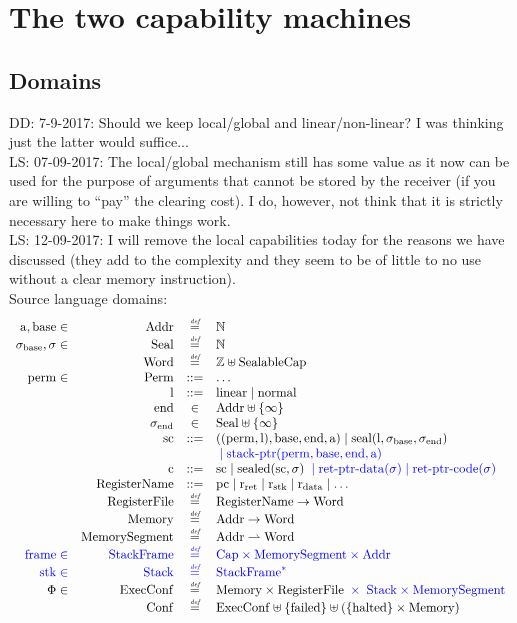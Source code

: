 \documentclass[a4paper]{article}
\newcommand\lau[1]{{\color{purple} \sf \footnotesize {LS: #1}}\\}
\newcommand\dominique[1]{{\color{purple} \sf \footnotesize {DD: #1}}\\}
\newcommand{\defeq}{\stackrel{\textit{\tiny{def}}}{=}}
\newcommand{\defbnf}{::=}
\newcommand{\fun}{\rightarrow}
\newcommand{\parfun}{\rightharpoonup}
\newcommand{\sourcecolor}{\color{blue}}
\newcommand{\src}[1]{{\sourcecolor #1}}
\newcommand{\nats}{\mathbb{N}}
\newcommand{\ints}{\mathbb{Z}}
\newcommand{\shareddom}[1]{\mathrm{#1}}
\newcommand{\RegName}{\shareddom{RegisterName}}
\newcommand{\Addr}{\shareddom{Addr}}
\newcommand{\Seal}{\shareddom{Seal}}
\newcommand{\Perm}{\shareddom{Perm}}
\newcommand{\Caps}{\shareddom{Cap}}
\newcommand{\SealableCaps}{\shareddom{SealableCap}}
\newcommand{\Word}{\shareddom{Word}}
\newcommand{\Mem}{\shareddom{Memory}}
\newcommand{\Reg}{\shareddom{RegisterFile}}
\newcommand{\Conf}{\shareddom{Conf}}
\newcommand{\ExecConf}{\shareddom{ExecConf}}
\newcommand{\MemSeg}{\shareddom{MemorySegment}}
\newcommand{\StkFrame}{\shareddom{StackFrame}}
\newcommand{\Stack}{\shareddom{Stack}}
\newcommand{\scbnf}{\shareddom{sc}}
\newcommand{\cbnf}{\shareddom{c}}
\newcommand{\permbnf}{\shareddom{perm}}
\newcommand{\addrbnf}{\shareddom{a}}
\newcommand{\basebnf}{\shareddom{base}}
\newcommand{\aendbnf}{\shareddom{end}}
\newcommand{\linbnf}{\shareddom{l}}
\newcommand{\sealbasebnf}{\sigma_\shareddom{base}}
\newcommand{\sealendbnf}{\sigma_\shareddom{end}}
\newcommand{\sstk}{\shareddom{stk}}
\newcommand{\sstkframe}{\shareddom{frame}}
\newcommand{\stkptr}[1]{\mathrm{stack\text{-}ptr}(#1)}
\newcommand{\retptrd}{\mathrm{ret\text{-}ptr\text{-}data}}
\newcommand{\retptrc}{\mathrm{ret\text{-}ptr\text{-}code}}
\newcommand{\seal}[1]{\shareddom{seal}(#1)}
\newcommand{\sealed}[1]{\shareddom{sealed}(#1)}
\newcommand{\failed}{\mathrm{failed}}
\newcommand{\halted}{\mathrm{halted}}
\newcommand{\pcreg}{\mathrm{pc}}
\newcommand{\rstk}{\mathrm{r}_\mathrm{stk}}
\newcommand{\rO}{\mathrm{r}_\mathrm{ret}}
\newcommand{\rret}{\rO}
\newcommand{\rdata}{\mathrm{r}_\mathrm{data}}
\newcommand{\plainlinearity}[1]{\mathrm{#1}}
\newcommand{\linear}{\plainlinearity{linear}}
\newcommand{\normal}{\plainlinearity{normal}}
\begin{document}
\section{The two capability machines}
\subsection{Domains}
\label{sec:domains}

\dominique{7-9-2017: Should we keep local/global and linear/non-linear?  I was thinking just the latter would suffice...}
\lau{07-09-2017: The local/global mechanism still has some value as it now can be used for the purpose of arguments that cannot be stored by the receiver (if you are willing to ``pay'' the clearing cost). I do, however, not think that it is strictly necessary here to make things work.}
\lau{12-09-2017: I will remove the local capabilities today for the reasons we have discussed (they add to the complexity and they seem to be of little to no use without a clear memory instruction).}
Source language domains:
\[
  \begin{array}{rrcl}
   \addrbnf,\basebnf \in & \Addr & \defeq & \nats \\
    \sealbasebnf, \sigma \in & \Seal & \defeq & \nats \\
    &\Word & \defeq & \ints \uplus \SealableCaps\\
    \permbnf \in& \Perm & \defbnf & \dots \\
    &\linbnf & \defbnf & \linear \mid \normal \\
    &\aendbnf & \in & \Addr \uplus \{\infty \} \\
    &\sealendbnf & \in & \Seal \uplus \{\infty \} \\
    &\scbnf &\defbnf & ((\permbnf,\linbnf),\basebnf,\aendbnf,\addrbnf) \mid \seal{\linbnf,\sealbasebnf,\sealendbnf}\\
    & & & {\sourcecolor{} \mid \stkptr{\permbnf,\basebnf,\aendbnf,\addrbnf}}\\ 
    &\cbnf & \defbnf &  \scbnf \mid \sealed{\scbnf,\sigma}{\sourcecolor{} \; \mid \retptrd(\sigma) \mid \retptrc(\sigma)}\\ 
    &\RegName & \defbnf &\pcreg \mid \rret \mid \rstk \mid \rdata \mid \dots \\
    &\Reg & \defeq & \RegName \fun \Word\\
    &\Mem & \defeq & \Addr \fun \Word \\
    &\MemSeg & \defeq & \Addr \parfun \Word \\
    {\sourcecolor \sstkframe \in} & {\sourcecolor \StkFrame} & {\sourcecolor \defeq} & {\sourcecolor \Caps \times \MemSeg \times \Addr}\\
    \src{\sstk \in}& \src{ \Stack} & \src{ \defeq} & \src{ \StkFrame^*} \\
    \Phi \in & \ExecConf & \defeq & \Mem \times \Reg {\sourcecolor{} \; \times \; \Stack \times \MemSeg }\\
    &\Conf & \defeq & \ExecConf \uplus \{\failed\} \uplus (\{\halted\} \times \Mem)
  \end{array}
\]
\end{document}
